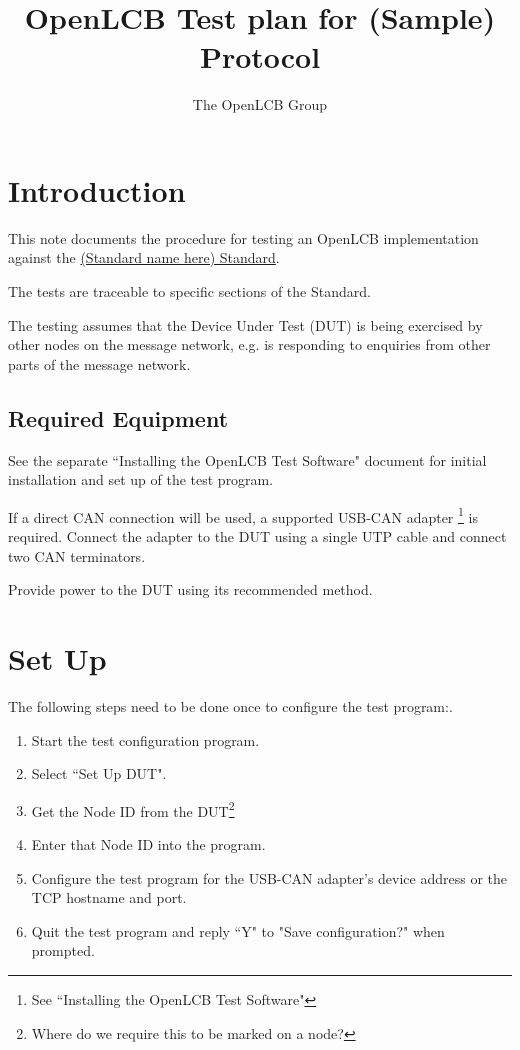 \documentclass[11pt]{article}
\title{OpenLCB Test plan for (Sample) Protocol}
\author{The OpenLCB Group}
\begin{document}
\maketitle


\section{Introduction}

This note documents the procedure for testing an OpenLCB implementation against the 
\href{url}{(Standard name here) Standard}.

The tests are traceable to specific sections of the Standard.

The testing assumes that the Device Under Test (DUT) is being exercised by other
nodes on the message network, 
e.g. is responding to enquiries from other parts of the message network.

\subsection{Required Equipment}

See the separate ``Installing the OpenLCB Test Software" document for initial installation 
and set up of the test program.

If a direct CAN connection will be used,
a supported USB-CAN adapter
    \footnote{See ``Installing the OpenLCB Test Software"}
is required. 
Connect the adapter to the DUT using a single UTP cable and connect two CAN terminators.

Provide power to the DUT using its recommended method.

\section{Set Up}
The following steps need to be done once to configure the test program:.
\begin{enumerate}
\item Start the test configuration program. 
\item Select ``Set Up DUT".
\item Get the Node ID from the DUT\footnote{Where do we require this to be marked on a node?} 
\item Enter that Node ID into the program.
\item Configure the test program for the USB-CAN adapter's device address
        or the TCP hostname and port.
\item Quit the test program and reply ``Y" to "Save configuration?" when prompted.
\end{enumerate}
\end{document}
